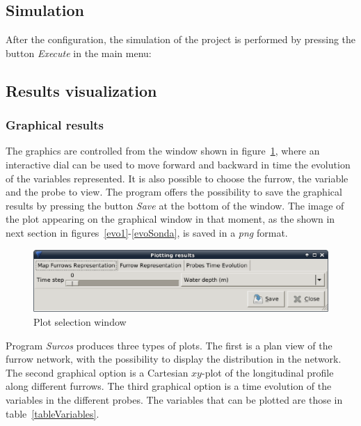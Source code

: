 \documentclass[review,authoryear]{elsarticle}
\begin{document}
\subsection{Simulation}

After the configuration, the simulation of the project is performed by pressing
the button \emph{Execute} in the main menu:

\subsection{Results visualization}

\subsubsection{Graphical results}

The graphics are controlled from the window shown in figure~\ref{barraRepres},
where an interactive dial can be used to move forward and backward in time the
evolution of the variables represented. It is also possible to choose the
furrow, the variable and the probe to view.  The program offers the possibility
to save the graphical results by pressing the button \emph{Save} at the bottom
of the window. The image of the plot appearing on the graphical window in that
moment, as the shown in next section in figures~\ref{evo1}-\ref{evoSonda}, is
saved in a \emph{png} format.

\begin{figure}[!ht]
\begin{center}
\includegraphics[width=706\UNIT]{menuRepresEN.eps}
\caption{Plot selection window}\label{barraRepres}
\end{center}
\end{figure}

Program \emph{Surcos} produces three types of plots. The first is a plan view of
the furrow network, with the possibility to display the distribution in the
network. The second graphical option is a Cartesian $xy$-plot of the
longitudinal profile along different furrows. The third graphical option is a
time evolution of the variables in the different probes. The variables that can
be plotted are those in table~\ref{tableVariables}.
\end{document}
